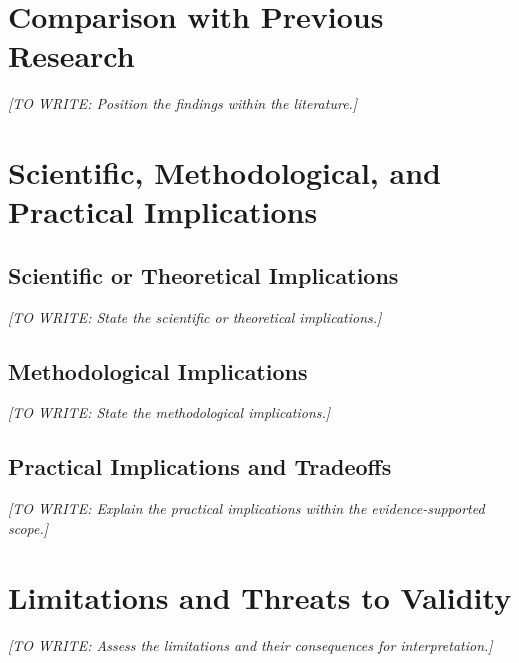 \documentclass[12pt,a4paper,oneside]{report}
\newif\ifshowguidance
\newcommand{\Guide}[1]{%
  \ifshowguidance
  \begin{tcolorbox}[enhanced,breakable,colback=GuideBlue,
    colframe=GuideBorder,boxrule=0.5pt,arc=1mm,
    title={Writing guide --- replace with your research},
    colbacktitle=ThesisBlue,coltitle=white,fonttitle=\small\bfseries,
    before skip=10pt,after skip=10pt]
    \small #1
  \end{tcolorbox}
  \fi}
\newcommand{\Draft}[1]{\par\noindent\textit{[TO WRITE: #1]}\par}
\begin{document}
\section{Comparison with Previous Research}
\Guide{Identify agreement and disagreement with specific studies. Explain
differences in data, context, assumptions, or methods that may account for
them. Use fair comparisons and avoid treating every difference as superiority.}
\Draft{Position the findings within the literature.}

\section{Scientific, Methodological, and Practical Implications}
\subsection{Scientific or Theoretical Implications}
\Guide{Explain which understanding, model, or theoretical expectation is
refined and what evidence supports that refinement.}
\Draft{State the scientific or theoretical implications.}
\subsection{Methodological Implications}
\Guide{Explain what other researchers can learn about study design,
measurement, modeling, analysis, or evaluation from this work.}
\Draft{State the methodological implications.}
\subsection{Practical Implications and Tradeoffs}
\Guide{Explain who could use the findings, under which conditions, and at
what cost or risk. State operational requirements and tradeoffs relevant
to real use. Do not claim deployment readiness based only on limited tests.}
\Draft{Explain the practical implications within the evidence-supported scope.}

\section{Limitations and Threats to Validity}
\Guide{Discuss limitations revealed by the completed study: selection,
measurement, implementation, analysis, confounding, model assumptions,
researcher interpretation, and limited coverage as applicable. Explain the
direction or likely consequence of each limitation rather than merely
listing generic weaknesses. Avoid equating transparency with elimination
of bias.}
\Draft{Assess the limitations and their consequences for interpretation.}
\end{document}
